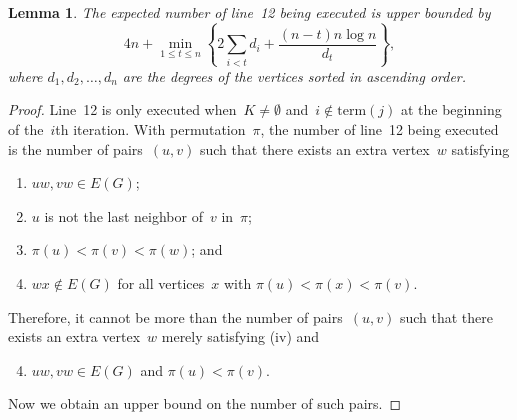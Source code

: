 \documentclass[a4paper,cleveref, autoref, 11pt, fleqn, thm-restate]{article}
\theoremstyle{plain}
\newtheorem{lemma}[theorem]{Lemma}
\begin{document}
\begin{lemma}\label{lem:analysis}
  The expected number of line~12 being executed is upper bounded by
  \[
    4n+ \min_{1\le t\le n}\left\{2\sum_{i< t}d_i+\frac{(n-t)n\log n}{d_{t}}\right\},
  \]
  where $d_1,d_2,\ldots,d_n$ are the degrees of the vertices sorted in ascending order.
\end{lemma}
\begin{proof}
  Line~12 is only executed when~$K\ne \emptyset$ and~$i\not\in \mathrm{term}(j)$ at the beginning of the~$i$th iteration.  With permutation~$\pi$, the number of line~12 being executed is the number of pairs~$(u, v)$ such that there exists an extra vertex~$w$ satisfying
  \begin{enumerate}[label = (\roman*),left=10pt]
    \item $u w, v w\in E(G)$;
    \item $u$ is not the last neighbor of~$v$ in~$\pi$;
    \item $\pi(u) < \pi(v) < \pi(w)$; and
    \item $w x\not\in E(G)$ for all vertices~$x$ with $\pi(u) < \pi(x) < \pi(v)$.
  \end{enumerate}
  Therefore, it cannot be more than the number of pairs~$(u, v)$ such that there exists an extra vertex~$w$ merely satisfying (iv) and
  \begin{enumerate}[label = (\roman*),left=10pt]
    \setcounter{enumi}{3}
    \item $u w, v w\in E(G)$ and $\pi(u) < \pi(v)$.
  \end{enumerate}
  Now we obtain an upper bound on the number of such pairs.


\end{proof}
\end{document}
